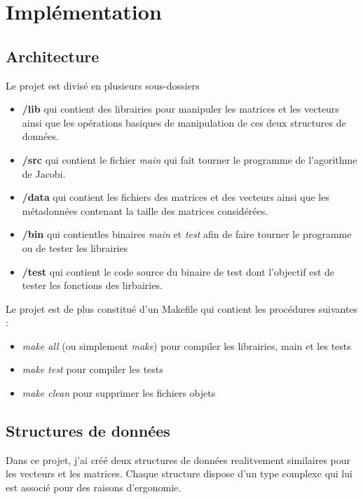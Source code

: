 \documentclass[11pt, a4paper]{article}
\begin{document}
\section{Implémentation}

\subsection{Architecture}

Le projet est divisé en plusieurs sous-dossiers
\begin{itemize}
    \item \textbf{/lib} qui contient des librairies pour manipuler les matrices et les vecteurs ainsi que les opérations basiques de manipulation de ces deux structures de données.
    \item \textbf{/src} qui contient le fichier \textit{main} qui fait tourner le programme de l'agorithme de Jacobi.
    \item \textbf{/data} qui contient les fichiers des matrices et des vecteurs ainsi que les métadonnées contenant la taille des matrices considérées.
    \item \textbf{/bin} qui contientles binaires \textit{main} et \textit{test} afin de faire tourner le programme ou de tester les librairies
    \item \textbf{/test} qui contient le code source du binaire de test dont l'objectif est de tester les fonctions des lirbairies.
\end{itemize}
Le projet est de plus constitué d'un Makefile qui contient les procédures suivantes :
\begin{itemize}
    \item \textit{make all} (ou simplement \textit{make}) pour compiler les librairies, main et les tests 
    \item \textit{make test} pour compiler les tests 
    \item \textit{make clean} pour supprimer les fichiers objets
\end{itemize}

\subsection{Structures de données}

Dans ce projet, j'ai créé deux structures de données realitvement similaires pour les vecteurs et les matrices. Chaque structure dispose d'un type complexe qui lui est associé pour des raisons d'ergonomie.\\
\end{document}
